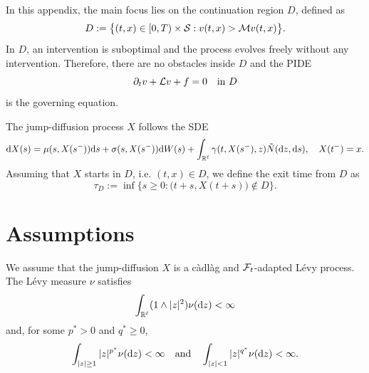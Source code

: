 In this appendix, the main focus lies on the continuation region $D$, defined as 
\begin{equation}
    D := \big\{ (t,x) \in [0,T) \times \mathcal{S}: v(t,x) > \mathcal{M} v(t,x) \big\}.
    \label{eqn: continuation region}
\end{equation}
In $D$, an intervention is suboptimal and the process evolves freely without any intervention. Therefore, there are no obstacles inside $D$ and the PIDE
\begin{equation*}
    \partial_t v + \mathcal{L} v + f = 0 \quad \text{in } D
\end{equation*}
is the governing equation. 

The jump-diffusion process $X$ follows the SDE
\begin{equation}
    \mathrm{d} X(s) = \mu(s,X(s^-)) \mathrm{d} s + \sigma(s,X(s^-)) \mathrm{d} W(s) + \int_{\mathbb{R}^\ell} \gamma(t,X(s^-),z) \tilde N(\mathrm{d} z, \mathrm{d} s), \quad X(t^-)=x. 
    \label{C: SDE}
\end{equation}
Assuming that $X$ starts in $D$, i.e. $(t,x) \in D$, we define the exit time from $D$ as
\begin{equation}
    \tau_D := \inf \big\{ s \geq 0: \big(t+s, X(t+s)\big) \notin D \big\}.
    \label{eqn: tau_D}
\end{equation}

\section{Assumptions}
\label{appendix: Assumptions}
We assume that the jump-diffusion $X$ is a càdlàg and $\mathcal{F}_t$-adapted Lévy process. The Lévy measure $\nu$ satisfies 
\begin{equation*}
    \int_{\mathbb{R}^\ell} (1 \wedge |z|^2) \nu(\mathrm{d} z) < \infty
\end{equation*}
and, for some $p^*>0$ and $q^*\geq 0$,
\begin{equation}
    \int_{|z|\geq 1}|z|^{p^*} \nu(\mathrm{d} z) < \infty \quad \text{and} \quad \int_{|z|<1} |z|^{q^*} \nu(\mathrm{d} z) < \infty.
    \label{C: p and q assumption}
\end{equation}

